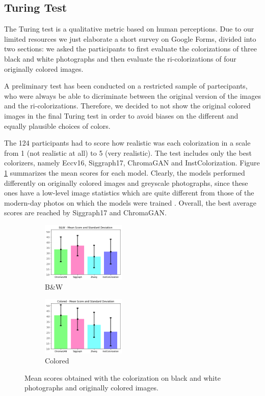 \subsection{Turing Test}
The Turing test is a qualitative metric based on human perceptions. Due to our limited resources we just elaborate a short survey on Google Forms, divided into two sections: we asked the participants to first evaluate the colorizations of three black and white photographs and then evaluate the ri-colorizations of four originally colored images. 

A preliminary test has been conducted on a restricted sample of partecipants, who were always be able to dicriminate between the original version of the images and the ri-colorizations. Therefore, we decided to not show the original colored images in the final Turing test in order to avoid biases on the different and equally plausible choices of colors. 

The 124 participants had to score how realistic was each colorization in a
scale from 1 (not realistic at all) to 5 (very realistic). The test includes only the best colorizers, namely Eccv16, Siggraph17, ChromaGAN and InstColorization. Figure \ref{fig:turing} summarizes the mean scores for each model. Clearly, the models performed differently on originally colored images and greyscale photographs, since these ones have a low-level image statistics which are quite different from those of the modern-day photos on which the models were trained \cite{zhang}.
Overall, the best average scores are reached by Siggraph17 and ChromaGAN.

\begin{figure}[h]
	\centering
	\captionsetup[subfigure]{labelformat=empty}
	\begin{subfigure}[b]{0.1\textwidth}
		\begin{adjustwidth}{-1.1cm}{}
		\includegraphics[width=4cm]{bw turing.png}
		\end{adjustwidth}
	\caption{B\&W}
	\end{subfigure}
\hspace{2.3cm}
	\begin{subfigure}[b]{0.1\textwidth}
		\begin{adjustwidth}{-1.1cm}{}
			\includegraphics[width=4cm]{col turing.png}
		\end{adjustwidth}
		\caption{Colored}
	\end{subfigure}
	\caption{{\small Mean scores obtained with the colorization on black and white photographs and originally colored images.}}
	\label{fig:turing}
\end{figure}